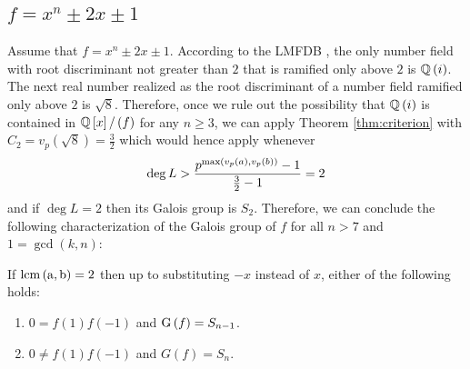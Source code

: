 \documentclass[../main.tex]{subfiles}
\begin{document}
\subsection{$f = x^n \pm 2x \pm 1$}
Assume that $f = x^n \pm 2x \pm 1$.
According to the LMFDB \cite{lmfdb}, the only number field with root discriminant not greater than $2$ that is ramified only above $2$ is $\mathbb{Q}\left( i \right)$.
The next real number realized as the root discriminant of a number field ramified only above $2$ is $\sqrt{8}$.
Therefore, once we rule out the possibility that $\mathbb{Q}\left( i \right)$ is contained in $\mathbb{Q}\left[ x \right] / \left( f \right)$ for any $n\geq 3$, we can apply Theorem \ref{thm:criterion} with $C_2 = v_p\left( \sqrt{8} \right) = \frac{3}{2}$ which would hence apply whenever 
\[
  \deg L > \frac{p^{\max\left( v_p\left( a \right), v_p\left( b \right) \right)} - 1}{\frac{3}{2} - 1} = 2
\]
and if $\deg L = 2$ then its Galois group is $S_2$.
Therefore, we can conclude the following characterization of the Galois group of $f$ for all $n > 7$ and $1 = \gcd\left( k,n \right)$:
\begin{corollary}
  If $\rm{lcm}\left( a,b \right) = 2$ then up to substituting $-x$ instead of $x$, either of the following holds:
  \begin{enumerate}
    \item $0 = f\left( 1 \right)f\left( -1 \right)$ and $\operatorname{\rm G}\left( f \right) = S_{n-1}$.
    \item $0 \neq f\left( 1 \right)f\left( -1 \right)$ and $G\left( f \right) = S_n$. 
  \end{enumerate}
\end{corollary}
\end{document}
